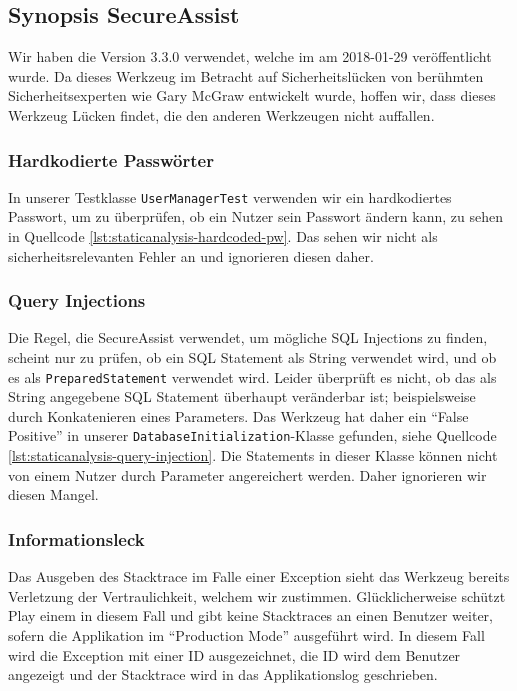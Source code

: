 \documentclass[12pt,DIV14,BCOR10mm,a4paper,parskip=half-,headsepline,headinclude,english,ngerman,bibliography=totocnumbered]{scrreprt}
\begin{document}
\subsection{Synopsis SecureAssist}

Wir haben die Version 3.3.0 verwendet, welche im am 2018-01-29 veröffentlicht wurde.
Da dieses Werkzeug im Betracht auf Sicherheitslücken von berühmten Sicherheitsexperten wie Gary McGraw entwickelt wurde, hoffen wir, dass dieses Werkzeug Lücken findet, die den anderen Werkzeugen nicht auffallen.

\subsubsection{Hardkodierte Passwörter}

In unserer Testklasse \texttt{UserManagerTest} verwenden wir ein hardkodiertes Passwort, um zu überprüfen, ob ein Nutzer sein Passwort ändern kann, zu sehen in Quellcode \ref{lst:staticanalysis-hardcoded-pw}.
Das sehen wir nicht als sicherheitsrelevanten Fehler an und ignorieren diesen daher.

\subsubsection{Query Injections}

Die Regel, die SecureAssist verwendet, um mögliche SQL Injections zu finden, scheint nur zu prüfen, ob ein SQL Statement als String verwendet wird, und ob es als \texttt{Prepared\-Statement} verwendet wird.
Leider überprüft es nicht, ob das als String angegebene SQL Statement überhaupt veränderbar ist; beispielsweise durch Konkatenieren eines Parameters.
Das Werkzeug hat daher ein \enquote{False Positive} in unserer \texttt{Database\-Initialization}-Klasse gefunden, siehe Quellcode \ref{lst:staticanalysis-query-injection}.
Die Statements in dieser Klasse können nicht von einem Nutzer durch Parameter angereichert werden. Daher ignorieren wir diesen Mangel.

\subsubsection{Informationsleck}

Das Ausgeben des Stacktrace im Falle einer Exception sieht das Werkzeug bereits Verletzung der Vertraulichkeit, welchem wir zustimmen.
Glücklicherweise schützt Play einem in diesem Fall und gibt keine Stacktraces an einen Benutzer weiter, sofern die Applikation im \enquote{Production Mode} ausgeführt wird.
In diesem Fall wird die Exception mit einer ID ausgezeichnet, die ID wird dem Benutzer angezeigt und der Stacktrace wird in das Applikationslog geschrieben.
\end{document}

